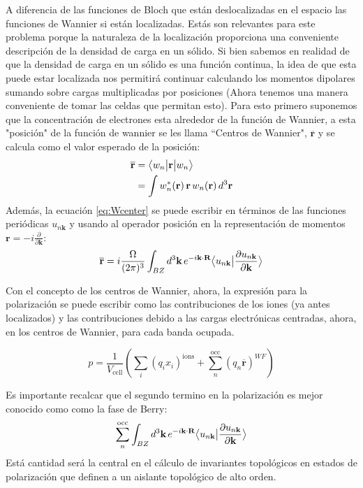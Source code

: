 A diferencia de las funciones de Bloch que están deslocalizadas en el espacio las funciones de Wannier si están localizadas. Estás son relevantes para este problema porque la naturaleza de la localización proporciona una conveniente descripción de la densidad de carga en un sólido. Si bien sabemos en
realidad de que la densidad de carga en un sólido es una función continua, la idea de que esta puede estar localizada nos permitirá continuar calculando los momentos dipolares sumando sobre cargas multiplicadas por posiciones (Ahora tenemos una manera conveniente de tomar las celdas que permitan esto).
Para esto primero suponemos que la concentración de electrones esta alrededor de la función de Wannier, a esta "posición" de la función de wannier se les llama ``Centros de Wannier", $\overline{\textbf{r}}$ y se calcula como el valor esperado de la posición:
\begin{equation}
\label{eq:Wcenter}
\begin{split}
        \overline{\textbf{r}} &= \big \langle{w_n}\big | {\textbf{r}} \big | {w_n} \big \rangle\\
        &= \int w^*_n(\textbf{r})\,\textbf{r}\, w_n(\textbf{r})\, d^3\textbf{r}
\end{split}
\end{equation}
 Además, la ecuación \eqref{eq:Wcenter} se puede escribir en términos de las funciones periódicas $u_{n\textbf{k}}$ y usando al operador posición en la representación de momentos $\textbf{r} = -i\frac{\partial}{\partial\textbf{k}}$:
\begin{equation}
    \overline{\textbf{r}} = i\frac{\Omega}{(2\pi)^3} \int_{BZ} d^3\textbf{k}\,e^{-i\textbf{k}\cdot\textbf{R}}\big \langle{u_{n\textbf{k}}}\big | {\frac{\partial u_{n\textbf{k}} }{\partial\textbf{k}}} \big \rangle
\end{equation}

Con el concepto de los centros de Wannier, ahora, la expresión para la polarización se puede escribir como las contribuciones de los iones (ya antes localizados) y las contribuciones debido a las cargas electrónicas centradas, ahora, en los centros de Wannier, para cada banda ocupada.

\begin{equation}
    p = \frac{1}{V_\text{cell}} (\sum_i (q_i x_i)^\text{ions} + \sum_n^\text{occ}(q_n \overline{\textbf{r}})^{WF})
\end{equation}

Es importante recalcar que el segundo termino en la polarización es mejor conocido como como la fase de Berry:
\begin{equation}
    \label{eq:Barry_fase}
    \sum_n^\text{occ}\int_{BZ} d^3\textbf{k}\,e^{-i\textbf{k}\cdot\textbf{R}}\big \langle{u_{n\textbf{k}}}\big | {\frac{\partial u_{n\textbf{k}} }{\partial\textbf{k}}} \big \rangle
\end{equation}
Está cantidad será la central en el cálculo de invariantes topológicos en estados de polarización que definen a un aislante topológico de alto orden. 


